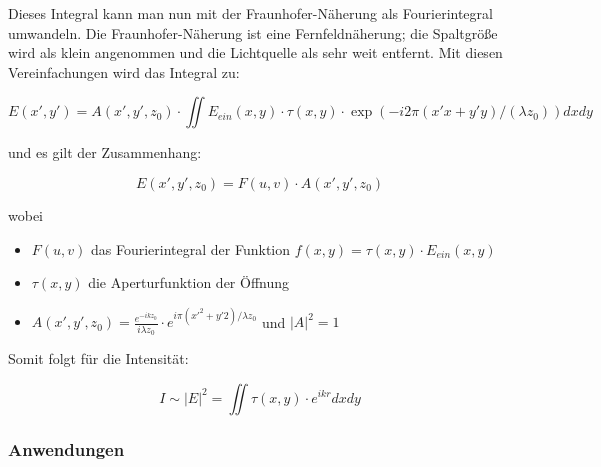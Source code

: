 Dieses Integral kann man nun mit der Fraunhofer-N\"aherung als Fourierintegral umwandeln. Die Fraunhofer-N\"aherung ist eine Fernfeldn\"aherung; die Spaltgr\"o\ss e wird als klein angenommen und die Lichtquelle als sehr weit entfernt. Mit diesen Vereinfachungen wird das Integral zu:

$$ E(x',y') = A(x',y',z_0)\cdot \iint E_{ein}(x,y)\cdot \tau(x,y)\cdot \exp(-i2\pi(x'x+y'y)/(\lambda z_0)) dxdy $$

und es gilt der Zusammenhang:

$$ E(x',y',z_0) = F(u,v) \cdot A(x',y',z_0)$$

wobei \begin{itemize}
\item $F(u,v)$ das Fourierintegral der Funktion $f(x,y) = \tau(x,y)\cdot E_{ein}(x,y)$
\item $\tau(x,y)$ die Aperturfunktion der \"Offnung
\item $A(x',y',z_0)=\frac{e^{-ikz_0}}{i\lambda z_0}\cdot e^{i\pi (x'^2 + y'2) / \lambda z_0}$ und $|A|^2 =1$
\end{itemize}

Somit folgt f\"ur die Intensit\"at:

$$I \sim |E|^2 = \iint \tau(x,y)\cdot e^{ikr} dxdy$$


\subsubsection{Anwendungen}

